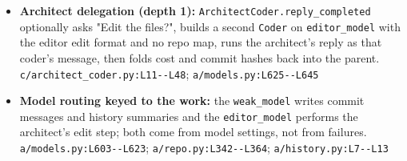 \begin{itemize}
\item \textbf{Architect delegation (depth 1):} \texttt{ArchitectCoder.\allowbreak{}reply\_\allowbreak{}completed} optionally asks "Edit the files?", builds a second \texttt{Coder} on \texttt{editor\_\allowbreak{}model} with the editor edit format and no repo map, runs the architect's reply as that coder's message, then folds cost and commit hashes back into the parent. \texttt{c/\allowbreak{}architect\_\allowbreak{}coder.\allowbreak{}py:\allowbreak{}L11-\allowbreak{}-\allowbreak{}L48}; \texttt{a/\allowbreak{}models.\allowbreak{}py:\allowbreak{}L625-\allowbreak{}-\allowbreak{}L645}
\item \textbf{Model routing keyed to the work:} the \texttt{weak\_\allowbreak{}model} writes commit messages and history summaries and the \texttt{editor\_\allowbreak{}model} performs the architect's edit step; both come from model settings, not from failures. \texttt{a/\allowbreak{}models.\allowbreak{}py:\allowbreak{}L603-\allowbreak{}-\allowbreak{}L623}; \texttt{a/\allowbreak{}repo.\allowbreak{}py:\allowbreak{}L342-\allowbreak{}-\allowbreak{}L364}; \texttt{a/\allowbreak{}history.\allowbreak{}py:\allowbreak{}L7-\allowbreak{}-\allowbreak{}L13}
\end{itemize}

